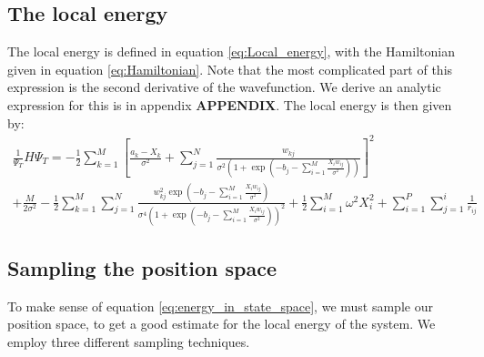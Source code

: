 \documentclass[a4paper, 10pt]{article}
\begin{document}
	\subsection{The local energy}
	The local energy is defined in equation \ref{eq:Local_energy}, with the Hamiltonian given in equation \ref{eq:Hamiltonian}. Note that the most complicated part of this expression is the second derivative of the wavefunction. We derive an analytic expression for this is in appendix \textbf{APPENDIX}. The local energy is then given by:
	\begin{equation}
	\begin{split}
	\frac{1}{\Psi_T}H\Psi_T=-\frac{1}{2}\sum_{k=1}^M\left[\frac{a_k-X_k}{\sigma^2}+\sum_{j=1}^N \frac{w_{kj}}{\sigma^2 \left(1+ \exp \left(-b_j-\sum_{i=1}^{M} \frac{X_iw_{ij}}{\sigma^2}\right)\right)}\right]^2\\
	+\frac{M}{2\sigma^2}-\frac{1}{2}\sum_{k=1}^M\sum_{j=1}^N \frac{w_{kj}^2 \exp \left(-b_j-\sum_{i=1}^{M}\frac{X_iw_{ij}}{\sigma^2} \right)}{\sigma^4\left(1+ \exp \left(-b_j-\sum_{i=1}^{M} \frac{X_iw_{ij}}{\sigma^2}\right)\right)^2}+\frac{1}{2}\sum_{i=1}^M\omega^2 X_i^2+\sum_{i=1}^P \sum_{j=1}^i \frac{1}{r_{ij}}
	\end{split}
	\end{equation}
	\subsection{Sampling the position space}
	To make sense of equation \ref{eq:energy_in_state_space}, we must sample our position space, to get a good estimate for the local energy of the system. We employ three different sampling techniques.	
\end{document}
